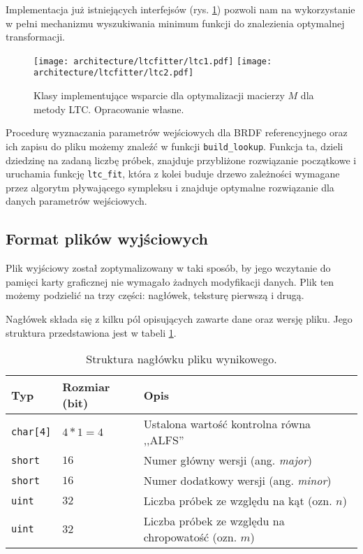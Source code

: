 \documentclass[../main.tex]{subfiles}
\newcommand{\graphvizscale}{0.09}
\begin{document}
Implementacja już istniejących interfejsów (rys. \ref{fig:LTCClassDiagram}) pozwoli nam na wykorzystanie w pełni mechanizmu wyszukiwania minimum funkcji do znalezienia optymalnej transformacji.

\begin{figure}[h]
    \centering
    \texttt{[image: architecture/ltcfitter/ltc1.pdf]}
    \texttt{[image: architecture/ltcfitter/ltc2.pdf]}
    \caption{Klasy implementujące wsparcie dla optymalizacji macierzy $M$ dla metody LTC. Opracowanie własne.}
    \label{fig:LTCClassDiagram}
\end{figure}

Procedurę wyznaczania parametrów wejściowych dla BRDF referencyjnego oraz ich zapisu do pliku możemy znaleźć w funkcji \texttt{build\_lookup}. Funkcja ta, dzieli dziedzinę na zadaną liczbę próbek, znajduje przybliżone rozwiązanie początkowe i uruchamia funkcję \texttt{ltc\_fit}, która z kolei buduje drzewo zależności wymagane przez algorytm pływającego sympleksu i znajduje optymalne rozwiązanie dla danych parametrów wejściowych.

\subsection{Format plików wyjściowych}


Plik wyjściowy został zoptymalizowany w taki sposób, by jego wczytanie do pamięci karty graficznej nie wymagało żadnych modyfikacji danych. Plik ten możemy podzielić na trzy części: nagłówek, teksturę pierwszą i drugą.

Nagłówek składa się z kilku pól opisujących zawarte dane oraz wersję pliku. Jego struktura przedstawiona jest w tabeli \ref{tab:alf_header}.

\begin{table}[h]
    \centering
    \begin{tabular}{|l|l|l|}
        \hline
        Typ & Rozmiar (bit) & Opis \\ \hline 
        \texttt{char[4]} & $4*1=4$ & Ustalona wartość kontrolna równa ,,ALFS'' \\ \hline
        \texttt{short} & $16$ & Numer główny wersji (ang. \textit{major}) \\ \hline
        \texttt{short} & $16$ & Numer dodatkowy wersji  (ang. \textit{minor}) \\ \hline
        \texttt{uint} & $32$ & Liczba próbek ze względu na kąt (ozn. $n$) \\ \hline
        \texttt{uint} & $32$ & Liczba próbek ze względu na chropowatość (ozn. $m$) \\ \hline
    \end{tabular}
    \caption{Struktura nagłówku pliku wynikowego.}
    \label{tab:alf_header}
\end{table}
\end{document}
